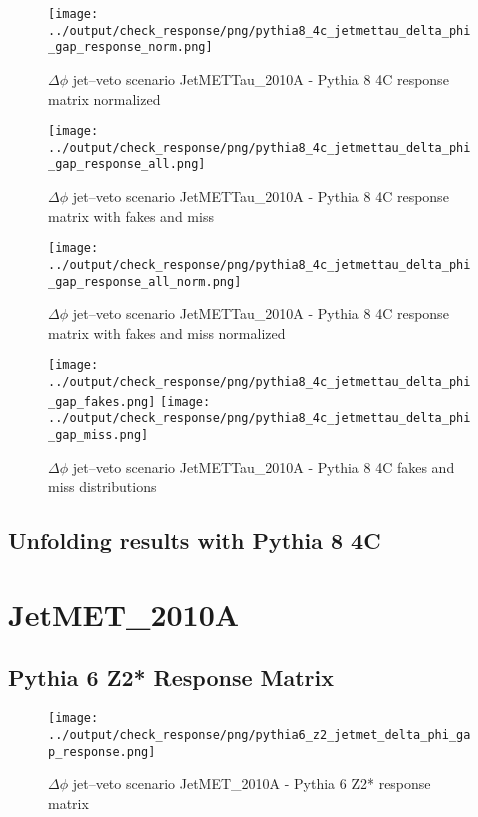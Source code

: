 \documentclass[11pt]{book}
\begin{document}
\begin{figure}[ht]
\centering
\texttt{[image: ../output/check\_response/png/pythia8\_4c\_jetmettau\_delta\_phi\_gap\_response\_norm.png]}
\caption{$\Delta\phi$ jet--veto scenario JetMETTau\_2010A - Pythia 8 4C response matrix normalized}
\label{p8_jetmettau_delta_phi_gap_response_norm}
\end{figure}

\begin{figure}[ht]
\centering
\texttt{[image: ../output/check\_response/png/pythia8\_4c\_jetmettau\_delta\_phi\_gap\_response\_all.png]}
\caption{$\Delta\phi$ jet--veto scenario JetMETTau\_2010A - Pythia 8 4C response matrix with fakes and miss}
\label{p8_jetmettau_delta_phi_gap_response_all}
\end{figure}

\begin{figure}[ht]
\centering
\texttt{[image: ../output/check\_response/png/pythia8\_4c\_jetmettau\_delta\_phi\_gap\_response\_all\_norm.png]}
\caption{$\Delta\phi$ jet--veto scenario JetMETTau\_2010A - Pythia 8 4C response matrix with fakes and miss normalized}
\label{p8_jetmettau_delta_phi_gap_response_all_norm}
\end{figure}

\begin{figure}[ht]
\centering
\texttt{[image: ../output/check\_response/png/pythia8\_4c\_jetmettau\_delta\_phi\_gap\_fakes.png]}
\texttt{[image: ../output/check\_response/png/pythia8\_4c\_jetmettau\_delta\_phi\_gap\_miss.png]}
\caption{$\Delta\phi$ jet--veto scenario JetMETTau\_2010A - Pythia 8 4C fakes and miss distributions}
\label{p8_jetmettau_delta_phi_gap_fakesmiss}
\end{figure}


\clearpage
\subsection{Unfolding results with Pythia 8 4C}


\section{JetMET\_2010A}
\subsection{Pythia 6 Z2* Response Matrix}

\begin{figure}[ht]
\centering
\texttt{[image: ../output/check\_response/png/pythia6\_z2\_jetmet\_delta\_phi\_gap\_response.png]}
\caption{$\Delta\phi$ jet--veto scenario JetMET\_2010A - Pythia 6 Z2* response matrix}
\label{p6_jetmet_delta_phi_gap_response}
\end{figure}
\end{document}
